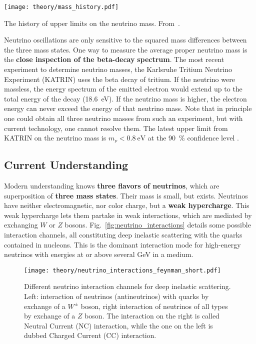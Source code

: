 \begin{marginfigure}
    \texttt{[image: theory/mass\_history.pdf]}
    \caption[Neutrino mass upper limit history]{The history of upper limits on the neutrino mass. From~\cite{Aker2022}.}
\end{marginfigure}

Neutrino oscillations are only sensitive to the squared mass differences between the three mass states. One way to measure the average proper neutrino mass is the \textbf{close inspection of the beta-decay} \textbf{spectrum}. The most recent experiment to determine neutrino masses, the Karlsruhe Tritium Neutrino Experiment (KATRIN) uses the beta decay of tritium. If the neutrino were massless, the energy spectrum of the emitted electron would extend up to the total energy of the decay (\SI{18.6}{\eV}). If the neutrino mass is higher, the electron energy can never exceed the energy of that neutrino mass. Note that in principle one could obtain all three neutrino masses from such an experiment, but with current technology, one cannot resolve them. The latest upper limit from KATRIN on the neutrino mass is $m_\nu < \SI{0.8}{\eV}$ at the \SI{90}{\percent} confidence level .


\subsection{Current Understanding}\label{neutrinos_current}
Modern understanding knows \textbf{three flavors of neutrinos}, which are superposition of \textbf{three mass states}. Their mass is small, but exists. Neutrinos have neither electromagnetic, nor color charge, but a \textbf{weak hypercharge}. This weak hypercharge lets them partake in weak interactions, which are mediated by exchanging $W$ or $Z$ bosons. Fig.~\ref{fig:neutrino_interactions} details some possible interaction channels, all constituting deep inelastic scattering with the quarks contained in nucleons. This is the dominant interaction mode for high-energy neutrinos with energies at or above several \unit{\giga\eV} in a medium.

\begin{figure}[htb]
    \texttt{[image: theory/neutrino\_interactions\_feynman\_short.pdf]}
    \caption[Neutrino interactions]{Different neutrino interaction channels for deep inelastic scattering. Left: interaction of neutrinos (antineutrinos) with quarks by exchange of a $W^{\pm}$ boson, right interaction of neutrinos of all types by exchange of a $Z$ boson. The interaction on the right is called Neutral Current (NC) interaction, while the one on the left is dubbed Charged Current (CC) interaction.}
\end{figure}


